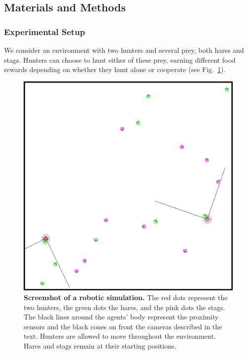   \subsection{Materials and Methods}
  \label{sec:methods}
    \subsubsection{Experimental Setup}
    \label{setup}
      We consider an environment with two hunters and several prey, both hares and stags. Hunters can choose to hunt either of these prey, earning different food rewards depending on whether they hunt alone or cooperate (see Fig.~\ref{fig:figureSimulation}).

      \begin{figure}[hbtp]
        \centering
          \includegraphics[scale = 0.25]{fig/ArticleBio1/Fig1.eps}
        \caption{\textbf{Screenshot of a robotic simulation.} 
        The red dots represent the two hunters, the green dots the hares, and the pink dots the stags. The black lines around the agents' body represent the proximity sensors and the black cones on front the cameras described in the text. Hunters are allowed to move throughout the environment. Hares and stags remain at their starting positions.}
        \label{fig:figureSimulation}
      \end{figure}

